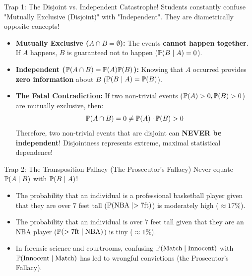 \begin{trapbox}{Trap 1: The Disjoint vs. Independent Catastrophe!}
Students constantly confuse "Mutually Exclusive (Disjoint)" with "Independent". They are diametrically opposite concepts!
\begin{itemize}
    \item \textbf{Mutually Exclusive ($A \cap B = \emptyset$):} The events \textbf{cannot happen together}. If $A$ happens, $B$ is guaranteed not to happen ($\P(B \mid A) = 0$).
    \item \textbf{Independent ($\P(A \cap B) = \P(A)\P(B)$):} Knowing that $A$ occurred provides \textbf{zero information} about $B$ ($\P(B \mid A) = \P(B)$).
    \item \textbf{The Fatal Contradiction:} If two non-trivial events ($\P(A) > 0, \P(B) > 0$) are mutually exclusive, then:
    $$\P(A \cap B) = 0 \neq \P(A) \cdot \P(B) > 0$$
    Therefore, two non-trivial events that are disjoint can \textbf{NEVER be independent}! Disjointness represents extreme, maximal statistical dependence!
\end{itemize}
\end{trapbox}

\begin{trapbox}{Trap 2: The Transposition Fallacy (The Prosecutor's Fallacy)}
Never equate $\P(A \mid B)$ with $\P(B \mid A)$!
\begin{itemize}
    \item The probability that an individual is a professional basketball player given that they are over 7 feet tall ($\P(\text{NBA} \mid >7\text{ft})$) is moderately high ($\approx 17\%$).
    \item The probability that an individual is over 7 feet tall given that they are an NBA player ($\P(>7\text{ft} \mid \text{NBA})$) is tiny ($\approx 1\%$).
    \item In forensic science and courtrooms, confusing $\P(\text{Match} \mid \text{Innocent})$ with $\P(\text{Innocent} \mid \text{Match})$ has led to wrongful convictions (the Prosecutor's Fallacy).
\end{itemize}
\end{trapbox}

